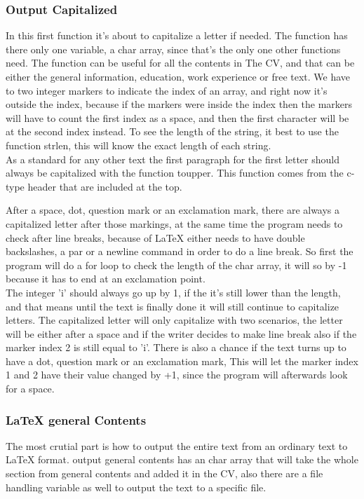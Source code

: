 \subsubsection{Output Capitalized}
In this first function it's about to capitalize a letter if needed.
The function has there only one variable, a char array, since that's the only one other functions need.
The function can be useful for all the contents in The CV,
and that can be either the general information, education, work experience or free text.
We have to two integer markers to indicate the index of an array, 
and right now it's outside the index, because if the markers were inside the index 
then the markers will have to count the first index as a space, 
and then the first character will be at the second index instead. %
To see the length of the string, it best to use the function strlen, this will know the exact length of each string. \\

As a standard for any other text the first paragraph for the first letter should always be capitalized with the function toupper.
This function comes from the c-type header that are included at the top.

After a space, dot, question mark or an exclamation mark, there are always a capitalized letter after those markings,
at the same time the program needs to check after line breaks, 
because of LaTeX either needs to have double backslashes, a par or a newline command
in order to do a line break. So first the program will do a for loop to check the length of the char array,
it will so by -1 because it has to end at an exclamation point.\\

The integer 'i' should always go up by 1, if the it's still lower than the length, and that means until the text is finally done 
it will still continue to capitalize letters. The capitalized letter will only capitalize with two scenarios, 
the letter will be either after a space and if the writer decides to make line break also if the marker index 2 is still equal to 'i'.
There is also a chance if the text turns up to have a dot, question mark or an exclamation mark, 
This will let the marker index 1 and 2 have their value changed by +1, since the program will afterwards look for a space. \\

\subsubsection{LaTeX general Contents}
The most crutial part is how to output the entire text from an ordinary text to LaTeX format.
output general contents has an char array that will take the whole section from general contents and added it in the CV,
also there are a file handling variable as well to output the text to a specific file. 

